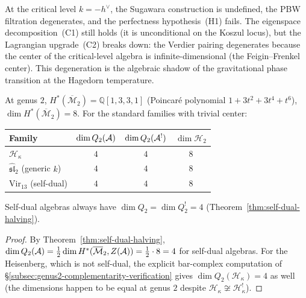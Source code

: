 \begin{remark}
\label{rem:thqg-III-critical-level}
At the critical level $k = -h^{\vee}$, the Sugawara
construction is undefined, the PBW filtration degenerates,
and the perfectness hypothesis~(H1) fails. The eigenspace
decomposition~(C1) still holds (it is unconditional on the
Koszul locus), but the Lagrangian upgrade~(C2) breaks down:
the Verdier pairing degenerates because the center of the
critical-level algebra is infinite-dimensional (the
Feigin--Frenkel center). This degeneration is the algebraic
shadow of the gravitational phase transition at the
Hagedorn temperature.
\end{remark}

\begin{proposition}
\label{prop:thqg-III-genus-2}
At genus $2$,
$H^*(\overline{\mathcal{M}}_2) = \mathbb{Q}[1, 3, 3, 1]$
\textup{(}Poincar\'{e} polynomial
$1 + 3t^2 + 3t^4 + t^6$\textup{)},
$\dim H^*(\overline{\mathcal{M}}_2) = 8$.
For the standard families with trivial center:
\begin{center}
\renewcommand{\arraystretch}{1.2}
\begin{tabular}{l@{\quad}c@{\quad}c@{\quad}c}
\textbf{Family}
& $\dim Q_2(\mathcal{A})$
& $\dim Q_2(\mathcal{A}^!)$
& $\dim \mathcal{H}_2$
\\
\midrule
$\mathcal{H}_\kappa$ & $4$ & $4$ & $8$ \\
$\widehat{\mathfrak{sl}}_2$ (generic $k$) & $4$ & $4$ & $8$ \\
$\mathrm{Vir}_{13}$ (self-dual) & $4$ & $4$ & $8$ \\
\end{tabular}
\end{center}
Self-dual algebras always have
$\dim Q_2 = \dim Q_2^! = 4$
\textup{(}Theorem~\textup{\ref{thm:self-dual-halving})}.
\end{proposition}

\begin{proof}
By Theorem~\ref{thm:self-dual-halving},
$\dim Q_2(\mathcal{A}) = \tfrac{1}{2} \dim H^*(\overline{\mathcal{M}}_2,
Z(\mathcal{A})) = \tfrac{1}{2} \cdot 8 = 4$ for self-dual algebras.
For the Heisenberg, which is not self-dual,
the explicit bar-complex computation of
\S\ref{subsec:genus2-complementarity-verification}
gives $\dim Q_2(\mathcal{H}_\kappa) = 4$ as well
(the dimensions happen to be equal at genus $2$ despite
$\mathcal{H}_\kappa \not\cong \mathcal{H}_\kappa^!$).
\end{proof}

